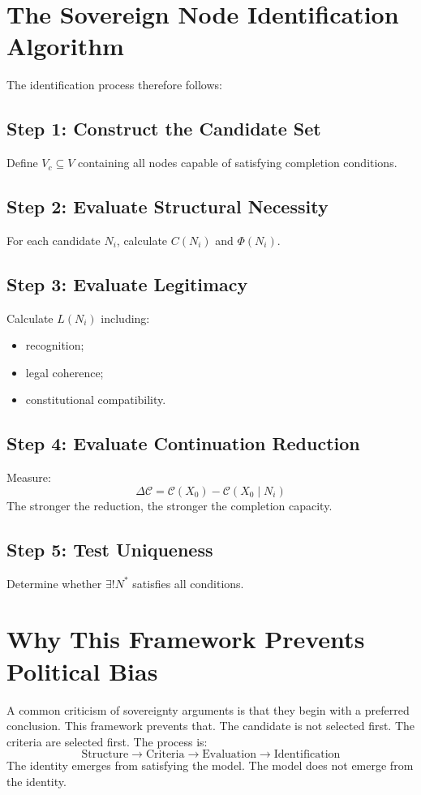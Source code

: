 \documentclass[11pt,openany]{book}
\theoremstyle{plain}
\theoremstyle{definition}
\begin{document}
\section{The Sovereign Node Identification Algorithm}

The identification process therefore follows:

\subsection{Step 1: Construct the Candidate Set}
Define \(V_c \subseteq V\) containing all nodes capable of satisfying completion conditions.

\subsection{Step 2: Evaluate Structural Necessity}
For each candidate \(N_i\), calculate \(C(N_i)\) and \(\Phi(N_i)\).

\subsection{Step 3: Evaluate Legitimacy}
Calculate \(L(N_i)\) including:
\begin{itemize}
\item recognition;
\item legal coherence;
\item constitutional compatibility.
\end{itemize}

\subsection{Step 4: Evaluate Continuation Reduction}
Measure:
\[
\Delta \mathcal{C} = \mathcal{C}(X_0) - \mathcal{C}(X_0 \mid N_i)
\]
The stronger the reduction, the stronger the completion capacity.

\subsection{Step 5: Test Uniqueness}
Determine whether \(\exists ! N^*\) satisfies all conditions.

\section{Why This Framework Prevents Political Bias}

A common criticism of sovereignty arguments is that they begin with a preferred conclusion. This framework prevents that. The candidate is not selected first. The criteria are selected first. The process is:
\[
\text{Structure} \longrightarrow \text{Criteria} \longrightarrow \text{Evaluation} \longrightarrow \text{Identification}
\]
The identity emerges from satisfying the model. The model does not emerge from the identity.
\end{document}
